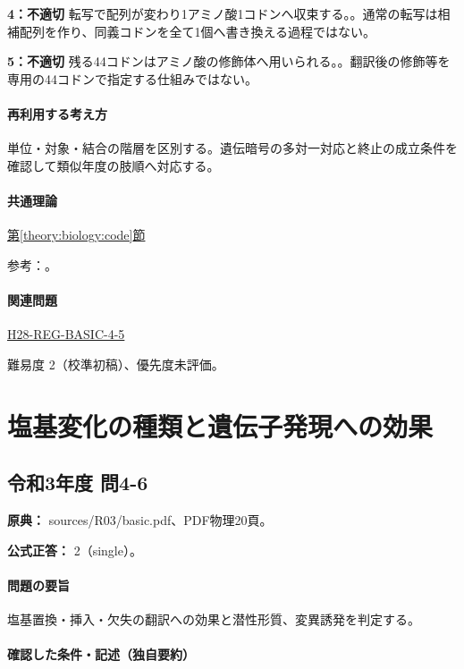\noindent\textbf{4：不適切} 転写で配列が変わり1アミノ酸1コドンへ収束する。。通常の転写は相補配列を作り、同義コドンを全て1個へ書き換える過程ではない。\par

\noindent\textbf{5：不適切} 残る44コドンはアミノ酸の修飾体へ用いられる。。翻訳後の修飾等を専用の44コドンで指定する仕組みではない。\par

\paragraph{再利用する考え方} 単位・対象・結合の階層を区別する。遺伝暗号の多対一対応と終止の成立条件を確認して類似年度の肢順へ対応する。

\paragraph{共通理論} \hyperref[theory:biology:code]{第\ref*{theory:biology:code}節}

\par 参考：\cite{nhgri_codon}。

\paragraph{関連問題} \hyperref[q:h28-reg-basic-4-5]{H28-REG-BASIC-4-5}

\par 難易度 2（校準初稿）、優先度未評価。

\section{塩基変化の種類と遺伝子発現への効果}

\subsection{令和3年度 問4-6}
\label{q:r03-reg-basic-4-6}

\noindent\textbf{原典：} sources/R03/basic.pdf、PDF物理20頁。

\textbf{公式正答：} 2（single）。

\paragraph{問題の要旨} 塩基置換・挿入・欠失の翻訳への効果と潜性形質、変異誘発を判定する。

\paragraph{確認した条件・記述（独自要約）}\mbox{}\par

